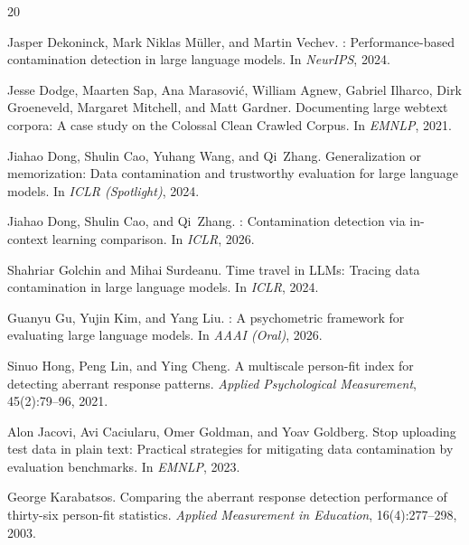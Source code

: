 \documentclass[11pt,a4paper]{article}
\begin{document}

\begin{thebibliography}{20}

Jasper Dekoninck, Mark Niklas M{\"u}ller, and Martin Vechev.
: Performance-based contamination detection in large language models.
\newblock In \emph{NeurIPS}, 2024.

Jesse Dodge, Maarten Sap, Ana Marasovi{\'c}, William Agnew, Gabriel Ilharco, Dirk Groeneveld, Margaret Mitchell, and Matt Gardner.
\newblock Documenting large webtext corpora: A case study on the {Colossal Clean Crawled Corpus}.
\newblock In \emph{EMNLP}, 2021.

Jiahao Dong, Shulin Cao, Yuhang Wang, and Qi~Zhang.
\newblock Generalization or memorization: Data contamination and trustworthy evaluation for large language models.
\newblock In \emph{ICLR (Spotlight)}, 2024.

Jiahao Dong, Shulin Cao, and Qi~Zhang.
: Contamination detection via in-context learning comparison.
\newblock In \emph{ICLR}, 2026.

Shahriar Golchin and Mihai Surdeanu.
\newblock Time travel in {LLMs}: Tracing data contamination in large language models.
\newblock In \emph{ICLR}, 2024.

Guanyu Gu, Yujin Kim, and Yang Liu.
: A psychometric framework for evaluating large language models.
\newblock In \emph{AAAI (Oral)}, 2026.

Sinuo Hong, Peng Lin, and Ying Cheng.
\newblock A multiscale person-fit index for detecting aberrant response patterns.
\newblock \emph{Applied Psychological Measurement}, 45(2):79--96, 2021.

Alon Jacovi, Avi Caciularu, Omer Goldman, and Yoav Goldberg.
\newblock Stop uploading test data in plain text: Practical strategies for mitigating data contamination by evaluation benchmarks.
\newblock In \emph{EMNLP}, 2023.

George Karabatsos.
\newblock Comparing the aberrant response detection performance of thirty-six person-fit statistics.
\newblock \emph{Applied Measurement in Education}, 16(4):277--298, 2003.


\end{thebibliography}
\end{document}
